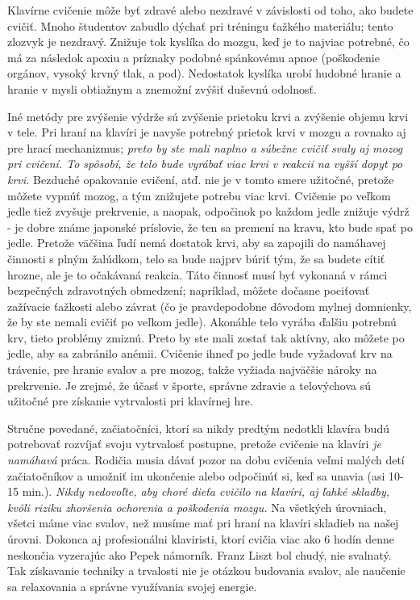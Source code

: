 Klavírne cvičenie môže byť zdravé alebo nezdravé v závislosti od toho, ako budete cvičiť. Mnoho študentov zabudlo dýchať pri tréningu ťažkého materiálu; tento zlozvyk je nezdravý. Znižuje tok kyslíka do mozgu, keď je to najviac potrebné, čo má za následok apoxiu a príznaky podobné spánkovému apnoe (poškodenie orgánov, vysoký krvný tlak, a pod). Nedostatok kyslíka urobí hudobné hranie a hranie v mysli obtiažnym a znemožní zvýšiť duševnú odolnosť.

Iné metódy pre zvýšenie výdrže sú zvýšenie prietoku krvi a zvýšenie objemu krvi v tele. Pri hraní na klavíri je navyše potrebný prietok krvi v mozgu a rovnako aj pre hrací mechanizmus; \emph{preto by ste mali naplno a súbežne cvičiť svaly aj mozog pri cvičení. To spôsobí, že telo bude vyrábať viac krvi v reakcii na vyšší dopyt po krvi.} Bezduché opakovanie cvičení, atď. nie je v tomto smere užitočné, pretože môžete vypnúť mozog, a tým znižujete potrebu viac krvi. Cvičenie po veľkom jedle tiež zvyšuje prekrvenie, a naopak, odpočinok po každom jedle znižuje výdrž - je dobre známe japonské príslovie, že ten sa premení na kravu, kto bude spať po jedle. Pretože väčšina ľudí nemá dostatok krvi, aby sa zapojili do namáhavej činnosti s plným žalúdkom, telo sa bude najprv búriť tým, že sa budete cítiť hrozne, ale je to očakávaná reakcia. Táto činnosť musí byť vykonaná v rámci bezpečných zdravotných obmedzení; napríklad, môžete dočasne pociťovať zažívacie ťažkosti alebo závrat (čo je pravdepodobne dôvodom mylnej domnienky, že by ste nemali cvičiť po veľkom jedle). Akonáhle telo vyrába ďalšiu potrebnú krv, tieto problémy zmiznú. Preto by ste mali zostať tak aktívny, ako môžete po jedle, aby sa zabránilo anémii. Cvičenie ihneď po jedle bude vyžadovať krv na trávenie, pre hranie svalov a pre mozog, takže vyžiada najväčšie nároky na prekrvenie. Je zrejmé, že účasť v športe, správne zdravie a telovýchova sú užitočné pre získanie vytrvalosti pri klavírnej hre.

Stručne povedané, začiatočníci, ktorí sa nikdy predtým nedotkli klavíra budú potrebovať rozvíjať svoju vytrvalosť postupne, pretože cvičenie na klavíri \textit{je namáhavá} práca. Rodičia musia dávať pozor na dobu cvičenia veľmi malých detí začiatočníkov a umožniť im ukončenie alebo odpočinúť si, keď sa unavia (asi 10-15 min.). \emph{Nikdy nedovoľte, aby choré dieťa cvičilo na klavíri, aj ľahké skladby, kvôli riziku zhoršenia ochorenia a poškodenia mozgu.} Na všetkých úrovniach, všetci máme viac svalov, než musíme mať pri hraní na klavíri skladieb na našej úrovni. Dokonca aj profesionálni klaviristi, ktorí cvičia viac ako 6 hodín denne neskončia vyzerajúc ako Pepek námorník. Franz Liszt bol chudý, nie svalnatý. Tak získavanie techniky a trvalosti nie je otázkou budovania svalov, ale naučenie sa relaxovania a správne využívania svojej energie.

